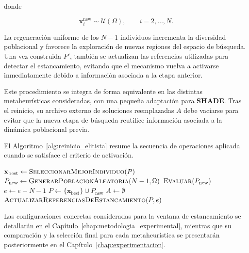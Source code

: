 donde

\begin{equation}
    \mathbf{x}^{\text{new}}_i
    \sim
    \mathcal{U}(\Omega),
    \qquad i = 2, \dots, N.
    \label{eq:muestreo_reinicio}
\end{equation}

La regeneración uniforme de los \(N-1\) individuos incrementa la diversidad
poblacional y favorece la exploración de nuevas regiones del espacio de
búsqueda. Una vez construida \(P'\), también se actualizan las referencias
utilizadas para detectar el estancamiento, evitando que el mecanismo vuelva
a activarse inmediatamente debido a información asociada a la etapa anterior.

Este procedimiento se integra de forma equivalente en las distintas
metaheurísticas consideradas, con una pequeña adaptación para \textbf{SHADE}.
Tras el reinicio, su archivo externo de soluciones reemplazadas \(A\) debe vaciarse para evitar que la nueva etapa de búsqueda reutilice información
asociada a la dinámica poblacional previa.

El Algoritmo~\ref{alg:reinicio_elitista} resume la secuencia de operaciones aplicada cuando se satisface el criterio de activación.

\begin{algorithm}[H]
    \begin{algorithmic}[1]
        \State $\mathbf{x}_{\text{best}} \gets
            \textsc{SeleccionarMejorIndividuo}(P)$
        \State $P_{\text{new}} \gets
            \textsc{GenerarPoblacionAleatoria}(N-1, \Omega)$
        \State $\textsc{Evaluar}(P_{\text{new}})$
        \State $e \gets e + N - 1$
        \State $P \gets
            \{\mathbf{x}_{\text{best}}\} \cup P_{\text{new}}$
        \State $A \gets \emptyset$
        \EndIf
        \State $\textsc{ActualizarReferenciasDeEstancamiento}(P, e)$
        \EndIf
    \end{algorithmic}
    \caption{Mecanismo de reinicio elitista.}
    \label{alg:reinicio_elitista}
\end{algorithm}

Las configuraciones concretas consideradas para la ventana de estancamiento se detallarán en el Capítulo~\ref{chap:metodologia_experimental}, mientras que su comparación y la selección final para cada metaheurística se presentarán posteriormente en el Capítulo~\ref{chap:experimentacion}.

